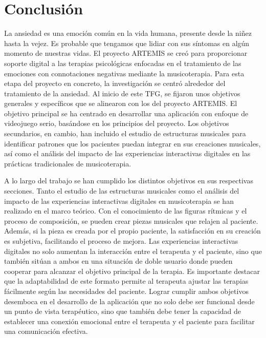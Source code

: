 \section{Conclusión}

La ansiedad es una emoción común en la vida humana, presente desde la niñez hasta la vejez. Es probable que tengamos que lidiar con sus síntomas en algún momento de nuestras vidas. El proyecto ARTEMIS se creó para proporcionar soporte digital a las terapias psicológicas enfocadas en el tratamiento de las emociones con connotaciones negativas mediante la musicoterapia. Para esta etapa del proyecto en concreto, la investigación se centró alrededor del tratamiento de la ansiedad. Al inicio de este TFG, se fijaron unos objetivos generales y específicos que se alinearon con los del proyecto ARTEMIS. El objetivo principal se ha centrado en desarrollar una aplicación con enfoque de videojuego serio, basándose en los principios del proyecto. Los objetivos secundarios, en cambio, han incluido el estudio de estructuras musicales para identificar patrones que los pacientes puedan integrar en sus creaciones musicales, así como el análisis del impacto de las experiencias interactivas digitales en las prácticas tradicionales de musicoterapia.

A lo largo del trabajo se han cumplido los distintos objetivos en sus respectivas secciones. Tanto el estudio de las estructuras musicales como el análisis del impacto de las experiencias interactivas digitales en musicoterapia se han realizado en el marco teórico. Con el conocimiento de las figuras rítmicas y el proceso de composición, se pueden crear piezas musicales que relajen al paciente. Además, si la pieza es creada por el propio paciente, la satisfacción en su creación es subjetiva, facilitando el proceso de mejora. Las experiencias interactivas digitales no solo aumentan la interacción entre el terapeuta y el paciente, sino que también sitúan a ambos en una situación de doble usuario donde pueden cooperar para alcanzar el objetivo principal de la terapia. Es importante destacar que la adaptabilidad de este formato permite al terapeuta ajustar las terapias fácilmente según las necesidades del paciente. Lograr cumplir ambos objetivos desemboca en el desarrollo de la aplicación que no solo debe ser funcional desde un punto de vista terapéutico, sino que también debe tener la capacidad de establecer una conexión emocional entre el terapeuta y el paciente para facilitar una comunicación efectiva.

